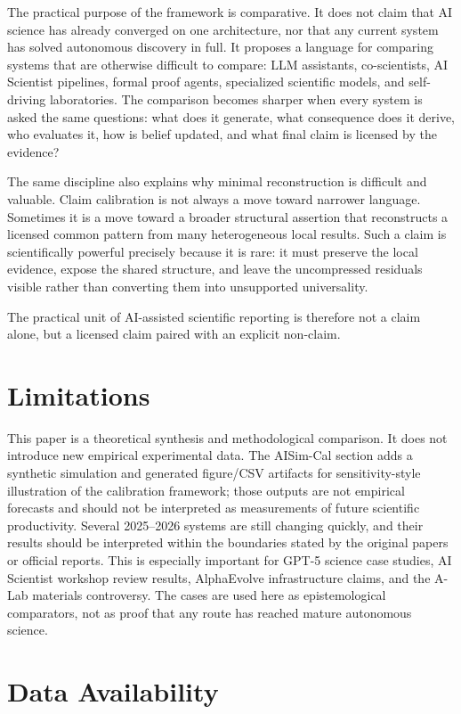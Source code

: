 \documentclass[11pt,a4paper]{article}
\begin{document}
The practical purpose of the framework is comparative. It does not claim that AI science has already converged on one architecture, nor that any current system has solved autonomous discovery in full. It proposes a language for comparing systems that are otherwise difficult to compare: LLM assistants, co-scientists, AI Scientist pipelines, formal proof agents, specialized scientific models, and self-driving laboratories. The comparison becomes sharper when every system is asked the same questions: what does it generate, what consequence does it derive, who evaluates it, how is belief updated, and what final claim is licensed by the evidence?

The same discipline also explains why minimal reconstruction is difficult and valuable. Claim calibration is not always a move toward narrower language. Sometimes it is a move toward a broader structural assertion that reconstructs a licensed common pattern from many heterogeneous local results. Such a claim is scientifically powerful precisely because it is rare: it must preserve the local evidence, expose the shared structure, and leave the uncompressed residuals visible rather than converting them into unsupported universality.

The practical unit of AI-assisted scientific reporting is therefore not a claim alone, but a licensed claim paired with an explicit non-claim.

\section*{Limitations}

This paper is a theoretical synthesis and methodological comparison. It does not introduce new empirical experimental data. The AISim-Cal section adds a synthetic simulation and generated figure/CSV artifacts for sensitivity-style illustration of the calibration framework; those outputs are not empirical forecasts and should not be interpreted as measurements of future scientific productivity. Several 2025--2026 systems are still changing quickly, and their results should be interpreted within the boundaries stated by the original papers or official reports. This is especially important for GPT-5 science case studies, AI Scientist workshop review results, AlphaEvolve infrastructure claims, and the A-Lab materials controversy. The cases are used here as epistemological comparators, not as proof that any route has reached mature autonomous science.

\section*{Data Availability}
\end{document}

